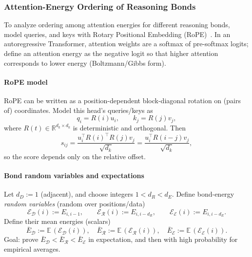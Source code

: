 \subsubsection{Attention-Energy Ordering of Reasoning Bonds}
To analyze ordering among attention energies for different reasoning bonds, model queries, and keys with Rotary Positional Embedding (RoPE)~\citep{su2024roformer}.
In an autoregressive Transformer, attention weights are a softmax of pre-softmax logits; define an attention energy as the negative logit so that higher attention corresponds to lower energy (Boltzmann/Gibbs form).

\paragraph{RoPE model}
RoPE can be written as a position-dependent block-diagonal rotation on (pairs of) coordinates.
Model this head's queries/keys as
\begin{equation}
q_i = R(i)u_i,\qquad k_j = R(j)v_j,
\end{equation}
where $R(t)\in\mathbb{R}^{d_k\times d_k}$ is deterministic and orthogonal.
Then
\begin{equation}
s_{ij}
=\frac{u_i^\top R(i)^\top R(j) v_j}{\sqrt{d_k}}
=\frac{u_i^\top R(i-j)v_j}{\sqrt{d_k}},
\end{equation}
so the score depends only on the relative offset.

\paragraph{Bond random variables and expectations}
Let $d_D:=1$ (adjacent), and choose integers $1<d_R<d_E$.
Define bond-energy \emph{random variables} (random over positions/data)
\begin{equation}
\mathcal{E}_{\mathcal{D}}(i) := E_{i,i-1},\qquad
\mathcal{E}_{\mathcal{R}}(i) := E_{i,i-d_R},\qquad
\mathcal{E}_{\mathcal{E}}(i) := E_{i,i-d_E}.
\end{equation}
Define their mean energies (scalars)
\begin{equation}
\bar E_{\mathcal{D}}:=\mathbb{E}\,(\mathcal{E}_{\mathcal{D}}(i)),\quad
\bar E_{\mathcal{R}}:=\mathbb{E}\,(\mathcal{E}_{\mathcal{R}}(i)),\quad
\bar E_{\mathcal{E}}:=\mathbb{E}\,(\mathcal{E}_{\mathcal{E}}(i)).
\end{equation}
Goal: prove $\bar E_{\mathcal{D}}<\bar E_{\mathcal{R}}<\bar E_{\mathcal{E}}$ in expectation, and then with high probability for empirical averages.

